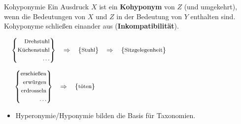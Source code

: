 \begin{frame}

\begin{block}{Kohyponymie}
Ein Ausdruck $X$ ist ein \textbf{Kohyponym} von $Z$ (und umgekehrt), wenn die Bedeutungen von $X$ und $Z$ in der Bedeutung von $Y$ enthalten sind. Kohyponyme schließen einander aus (\textbf{Inkompatibilität}).
\end{block}

\ea $$ \footnotesize
\left\{
\begin{aligned}
\text{Drehstuhl}\\
\text{Küchenstuhl}\\
\dots
\end{aligned} 
\right\} 
\quad \Rightarrow \quad
\left\{
\begin{aligned}
\text{Stuhl}\\
\end{aligned} 
\right\} 
\quad \Rightarrow \quad
\left\{
\begin{aligned}
\text{Sitzgelegenheit}\\
\end{aligned} 
\right\} \hspace{4cm}
$$

\ex $$ \footnotesize
\left\{
\begin{aligned}
\text{erschießen}\\
\text{erwürgen}\\
\text{erdrosseln}\\
\dots
\end{aligned}
\right\}
\quad \Rightarrow \quad
\left\{
\begin{aligned}
\text{töten}\\
\end{aligned}
\right\} \hspace{7.5cm}
$$

\z

\begin{itemize}
	\item Hyperonymie/Hyponymie bilden die Basis für Taxonomien.
\end{itemize}

\end{frame}


